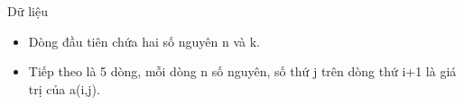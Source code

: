 Dữ liệu
\begin{itemize}
	\item Dòng đầu tiên chứa hai số nguyên n và k.
	\item Tiếp theo là 5 dòng, mỗi dòng n số nguyên, số thứ j trên dòng thứ i+1 là giá trị của a(i,j).
\end{itemize}